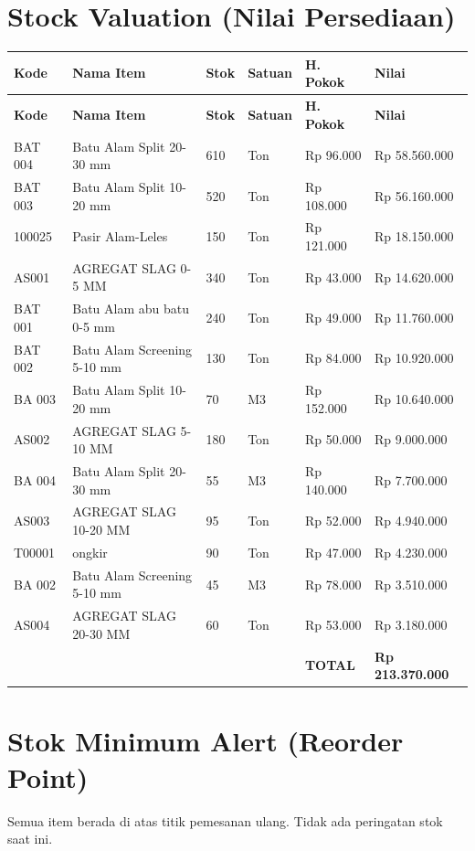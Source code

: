 \documentclass[11pt,a4paper]{article}
\begin{document}
\section{Stock Valuation (Nilai Persediaan)}
{\setlength{\tabcolsep}{5pt}\small
\begin{longtable}{l p{4.2cm} R{1.6cm} l R{2.4cm} R{2.8cm}}
\toprule
\textbf{Kode} & \textbf{Nama Item} & \textbf{Stok} & \textbf{Satuan} & \textbf{H. Pokok} & \textbf{Nilai} \\
\midrule\endfirsthead
\toprule
\textbf{Kode} & \textbf{Nama Item} & \textbf{Stok} & \textbf{Satuan} & \textbf{H. Pokok} & \textbf{Nilai} \\
\midrule\endhead
\bottomrule\endfoot
BAT 004 & Batu Alam Split 20-30 mm & 610 & Ton & Rp 96.000 & Rp 58.560.000 \\
BAT 003 & Batu Alam Split 10-20 mm & 520 & Ton & Rp 108.000 & Rp 56.160.000 \\
100025 & Pasir Alam-Leles & 150 & Ton & Rp 121.000 & Rp 18.150.000 \\
AS001 & AGREGAT SLAG 0-5 MM & 340 & Ton & Rp 43.000 & Rp 14.620.000 \\
BAT 001 & Batu Alam abu batu 0-5 mm & 240 & Ton & Rp 49.000 & Rp 11.760.000 \\
BAT 002 & Batu Alam Screening 5-10 mm & 130 & Ton & Rp 84.000 & Rp 10.920.000 \\
BA 003 & Batu Alam Split 10-20 mm & 70 & M3 & Rp 152.000 & Rp 10.640.000 \\
AS002 & AGREGAT SLAG 5-10 MM & 180 & Ton & Rp 50.000 & Rp 9.000.000 \\
BA 004 & Batu Alam Split 20-30 mm & 55 & M3 & Rp 140.000 & Rp 7.700.000 \\
AS003 & AGREGAT SLAG 10-20 MM & 95 & Ton & Rp 52.000 & Rp 4.940.000 \\
T00001 & ongkir & 90 & Ton & Rp 47.000 & Rp 4.230.000 \\
BA 002 & Batu Alam Screening 5-10 mm & 45 & M3 & Rp 78.000 & Rp 3.510.000 \\
AS004 & AGREGAT SLAG 20-30 MM & 60 & Ton & Rp 53.000 & Rp 3.180.000 \\
 &  &  &  & \textbf{TOTAL} & \textbf{Rp 213.370.000} \\
\end{longtable}}

\section{Stok Minimum Alert (Reorder Point)}
Semua item berada di atas titik pemesanan ulang. Tidak ada peringatan stok saat ini.
\end{document}
